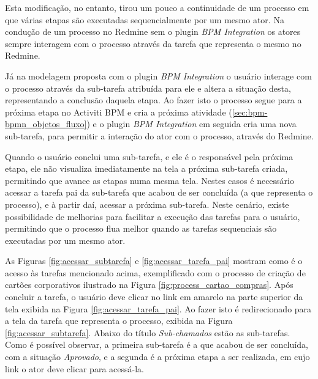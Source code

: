 Esta modificação, no entanto, tirou um pouco a continuidade de um processo em que várias etapas são executadas sequencialmente por um mesmo ator. Na condução de um processo no Redmine sem o plugin \textit{BPM Integration} os atores sempre interagem com o processo através da tarefa que representa o mesmo no Redmine. 

Já na modelagem proposta com o plugin \textit{BPM Integration} o usuário interage com o processo através da sub-tarefa atribuída para ele e altera a situação desta, representando a conclusão daquela etapa. Ao fazer isto o processo segue para a próxima etapa no Activiti BPM e cria a próxima atividade (\ref{sec:bpm-bpmn_objetos_fluxo}) e o plugin \textit{BPM Integration} em seguida cria uma nova sub-tarefa, para permitir a interação do ator com o processo, através do Redmine. 

Quando o usuário conclui uma sub-tarefa, e ele é o responsável pela próxima etapa, ele não visualiza imediatamente na tela a próxima sub-tarefa criada, permitindo que avance as etapas numa mesma tela. Nestes casos é necessário acessar a tarefa pai da sub-tarefa que acabou de ser concluída (a que representa o processo), e à partir daí, acessar a próxima sub-tarefa. Neste cenário, existe possibilidade de melhorias para facilitar a execução das tarefas para o usuário, permitindo que o processo flua melhor quando as tarefas sequenciais são executadas por um mesmo ator.

As Figuras \ref{fig:acessar_subtarefa} e \ref{fig:acessar_tarefa_pai} mostram como é o acesso às tarefas mencionado acima, exemplificado com o processo de criação de cartões corporativos ilustrado na Figura \ref{fig:process_cartao_compras}. Após concluir a tarefa, o usuário deve clicar no link em amarelo na parte superior da tela exibida na Figura \ref{fig:acessar_tarefa_pai}. Ao fazer isto é redirecionado para a tela da tarefa que representa o processo, exibida na Figura \ref{fig:acessar_subtarefa}. Abaixo do título \textit{Sub-chamados} estão as sub-tarefas. Como é possível observar, a primeira sub-tarefa é a que acabou de ser concluída, com a situação \textit{Aprovado}, e a segunda é a próxima etapa a ser realizada, em cujo link o ator deve clicar para acessá-la.

